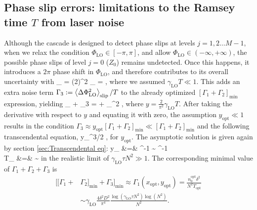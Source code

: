 \subsection{Phase slip errors: limitations to the Ramsey time $T$ from laser noise}
\label{sec:PSE}
Although the cascade is designed to detect phase slips at levels $j=1,2\dots
M-1$, when we relax the condition $\Phi_\mathrm{LO}\in [-\pi,\pi]$, and allow
$\Phi_\mathrm{LO} \in (-\infty, + \infty)$, the possible phase slips of level
$j=0$ ($Z_0$) remains undetected.
Once this happens, it introduces a $2\pi$ phase shift in $\Phi_\mathrm{LO}$, and
therefore contributes to its overall uncertainty with
\bel
	\label{eq:Slip_GHZ 2}
	_ = (2\pi)^2
	\PP_ = 
	\sqrt{32\pi} 
	\exp{},
\eel
where we
assumed $\gamma_\mathrm{LO}T \ll 1$.
This adds an extra noise term $\Gamma_3 := 
\left< \Delta\Phi_\mathrm{LO}^2 \right>_\mathrm{slip}/T$ to the already optimized $[\Gamma_1 +
\Gamma_2]_\mathrm{min}$ expression, yielding
_ + \Gamma_3 = 
	 +  \tau
	\gamma_^2 \exp{},
\eel
where $y = \frac{2}{\pi^2}\gamma_\mathrm{LO}T$. After taking the derivative
with respect to $y$ and equating it with zero, the assumption $y_\mathrm{opt}\ll
1$ results in the condition $\Gamma_3 \approx y_\mathrm{opt} [\Gamma_1 +
\Gamma_2]_\mathrm{min} \ll [\Gamma_1 + \Gamma_2]_\mathrm{min}$ and the following
transcendental equation,
\bel
	y_^{3/2} \approx {} \exp{},
\eel
for $y_\mathrm{opt}$.
The asymptotic solution is given again by section \ref{sec:Transcendental eq}:
\bal
	y_ &=& ^{-1}\!\!\!\!\!\! \sim
	^{-1}\quad
	\\
	\label{eq:T_op_GHZ 2}
	T_ &=&  \sim
\eal
in the realistic limit of $\gamma_\mathrm{LO}\tau N^2 \gg 1$. The corresponding
minimal value of $\Gamma_1 + \Gamma_2 + \Gamma_3$ is
\begin{align}%
	\Big[[\Gamma_1 + &\Gamma_2]_\mathrm{min} + \Gamma_3\Big]_\mathrm{min} \approx \Gamma_1(x_\mathrm{opt},y_\mathrm{opt}) =\frac{n_0^\mathrm{opt}\delta^2}{N^2T_\mathrm{opt}} \\\label{eq:EK4}
	&\sim
	 \gamma_\mathrm{LO}\frac{4\delta^2
	D^2}{\pi^4}\frac{\log(\gamma_\mathrm{LO}\tau N^2)\log(N^2)}{N^2}.
\end{align}


